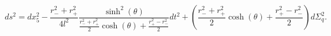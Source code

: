 \begin{equation}
ds^2= dx_5^2
-\frac{r_-^2+r_+^2}{4l^2}\frac{\sinh ^2 (\theta)}{\frac{r_-^2+r_+^2}{2}\cosh (\theta)+\frac{r_+^2-r_-^2}{2}}
dt^2 + (\frac{r_-^2+r_+^2}{2}\cosh (\theta)+\frac{r_+^2-r_-^2}{2})
d\Sigma_q^2.
\end{equation}

